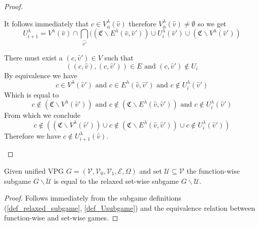 \begin{lemma}
\begin{proof}
\begin{itemize}
			
			It follows immediately that $c \in V^\lambda_{\overline{\alpha}}(\hat{v})$ therefore $V^\lambda_{\overline{\alpha}}(\hat{v}) \neq \emptyset$ so we get
			\[ U^\lambda_{i+1} =V^\lambda(\hat{v}) \cap \bigcap_{\hat{v'}}((\mathfrak{C} \backslash E^\lambda(\hat{v},\hat{v}')) \cup U^\lambda_i(\hat{v}') \cup (\mathfrak{C}\backslash V^\lambda(\hat{v}')) \]
			
			There must exist a $(c,\hat{v}') \in V$ such that 
			\[ ((c,\hat{v}),(c,\hat{v}')) \in E  \text{ and } (c,\hat{v}') \notin U_i \]
			By equivalence we have 
			\[ c \in V^\lambda(\hat{v}')  \text{ and } c \in E^\lambda(\hat{v},\hat{v}')  \text{ and } c \notin U^\lambda_i(\hat{v}') \]
			Which is equal to
			\[ c \notin (\mathfrak{C} \backslash V^\lambda(\hat{v}'))  \text{ and } c \notin (\mathfrak{C} \backslash E^\lambda(\hat{v},\hat{v}'))  \text{ and } c \notin U^\lambda_i(\hat{v}') \]
			From which we conclude
			\[ c \notin ((\mathfrak{C} \backslash V^\lambda(\hat{v}')) \cup c \notin (\mathfrak{C} \backslash E^\lambda(\hat{v},\hat{v}')) \cup c \notin U^\lambda_i(\hat{v}')) \]
			Therefore we have $c \notin U^\lambda_{i+1}(\hat{v})$.
		\end{itemize}
	\end{proof}
\end{lemma}
\begin{lemma}
	\label{lem_subgame_eq}
	Given unified VPG $G = (\mathcal{V},\mathcal{V}_0,\mathcal{V}_1, \mathcal{E}, \Omega)$ and set $\mathcal{U} \subseteq \mathcal{V}$ the function-wise subgame $G \backslash \mathcal{U}$ is equal to the relaxed set-wise subgame $G \backslash \mathcal{U}$.
	\begin{proof}
		Follows immediately from the subgame definitions (\ref{def_relaxed_subgame}, \ref{def_Usubgame}) and the equivalence relation between function-wise and set-wise games.
	\end{proof}
\end{lemma}

